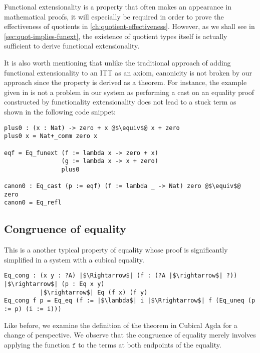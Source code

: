 \documentclass[12pt,twoside,maitrise]{dms}
\theoremstyle{definition}
\numberwithin{equation}{section}
\numberwithin{table}{chapter}
\numberwithin{figure}{chapter}
\newcommand\id[1] {\texttt{#1}}
\begin{document}
Functional extensionality is a property that often makes an appearance in
mathematical proofs, it will especially be required in order to prove the
effectiveness of quotients in \autoref{ch:quotient-effectiveness}. However, as
we shall see in \autoref{sec:quot-implies-funext}, the existence of quotient
types itself is actually sufficient to derive functional extensionality.

It is also worth mentioning that unlike the traditional approach of adding
functional extensionality to an ITT as an axiom, canonicity is not broken by our
approach since the property is derived as a theorem. For instance, the example
given in\cite{altenkirch2007observational} is not a problem in our system as
performing a cast on an equality proof constructed by functionality
extensionality does not lead to a stuck term as shown in the following code snippet:

\begin{verbatim}
plus0 : (x : Nat) -> zero + x @$\equiv$@ x + zero
plus0 x = Nat+_comm zero x

eqf = Eq_funext (f := lambda x -> zero + x)
                (g := lambda x -> x + zero)
                plus0

canon0 : Eq_cast (p := eqf) (f := lambda _ -> Nat) zero @$\equiv$@ zero
canon0 = Eq_refl
\end{verbatim}

\subsection*{Congruence of equality}\label{subsec:congruence-eq}
This is a another typical property of equality whose proof is significantly
simplified in a system with a cubical equality.

\begin{verbatim}
Eq_cong : (x y : ?A) |$\Rightarrow$| (f : (?A |$\rightarrow$| ?)) |$\rightarrow$| (p : Eq x y)
          |$\rightarrow$| Eq (f x) (f y)
Eq_cong f p = Eq_eq (f := |$\lambda$| i |$\Rrightarrow$| f (Eq_uneq (p := p) (i := i)))
\end{verbatim}


Like before, we examine the definition of the theorem in Cubical Agda for a
change of perspective. We observe that the congruence of equality merely
involves applying the function $\id{f}$ to the terms at both endpoints of the
equality.
\end{document}
